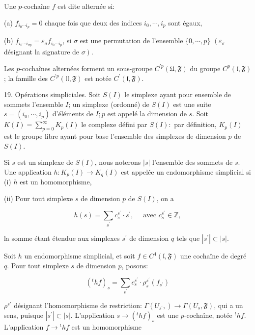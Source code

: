 Une $p$-cochaîne $f$ est dite alternée si:

(a) $f_{i_{0} \cdots i_{p}}=0$ chaque fois que deux des indices $i_{0}, \cdots, i_{p}$ sont égaux,

(b) $f_{i_{0} \cdots i_{\sigma p}}=\varepsilon_{\sigma} f_{i_{0} \cdots i_{p}}$, si $\sigma$ est une permutation de l'ensemble $\{0, \cdots, p\}$ $\left(\varepsilon_{\sigma}\right.$ désignant la signature de $\left.\sigma\right)$.

Les $p$-cochaînes alternées forment un sous-groupe $C^{\prime p}(\mathfrak{U}, \mathfrak{F})$ du groupe $C^{p}(\mathfrak{l}, \mathfrak{F})$; la famille des $C^{\prime p}(\mathfrak{l l}, \mathfrak{F})$ est notée $C^{\prime}(\mathfrak{l}, \mathfrak{F})$.

19. Opérations simpliciales. Soit $S(I)$ le simplexe ayant pour ensemble de sommets l'ensemble $I$; un simplexe (ordonné) de $S(I)$ est une suite $s=\left(i_{0}, \cdots, i_{p}\right)$ d'éléments de $I ; p$ est appelé la dimension de $s .$ Soit $K(I)=\sum_{p=0}^{\infty} K_{p}(I)$ le complexe défini par $S(I):$ par définition, $K_{p}(I)$ est le groupe libre ayant pour base l'ensemble des simplexes de dimension $p$ de $S(I)$.

Si $s$ est un simplexe de $S(I)$, nous noterons $|s|$ l'ensemble des sommets de $s .$ Une application $h: K_{p}(I) \rightarrow K_{q}(I)$ est appelée un endomorphisme simplicial si (i) $h$ est un homomorphisme,

(ii) Pour tout simplexe $s$ de dimension $p$ de $S(I)$, on a

$$
h(s)=\sum_{s^{\prime}} c_{s}^{s^{\prime}} \cdot s^{\prime}, \quad \text { avec } c_{s}^{s^{\prime}} \in \mathbb{Z},
$$

la somme étant étendue aux simplexes $s^{\prime}$ de dimension $q$ tels que $\left|s^{\prime}\right| \subset|s|$.

Soit $h$ un endomorphisme simplicial, et soit $f \in C^{4}(\mathfrak{l}, \mathfrak{F})$ une cochaîne de degré $q$. Pour tout simplexe $s$ de dimension $p$, posons:

$$
\left({ }^{t} h f\right)_{s}=\sum_{s^{\prime}} c_{s}^{s^{\prime}} \cdot \rho_{s}^{s^{\prime}}\left(f_{s^{\prime}}\right)
$$

$\rho^{s \prime}$ désignant l'homomorphisme de restriction: $\Gamma\left(U_{s^{\prime}}, \mathfrak{}\right) \rightarrow \Gamma\left(U_{s}, \mathfrak{F}\right)$, qui a un sens, puisque $\left|s^{\prime}\right| \subset|s| .$ L'application $s \rightarrow\left({ }^{t} h f\right)_{s}$ est une $p$-cochaîne, notée ${ }^{t} h f$. L'application $f \rightarrow{ }^{t} h f$ est un homomorphisme

